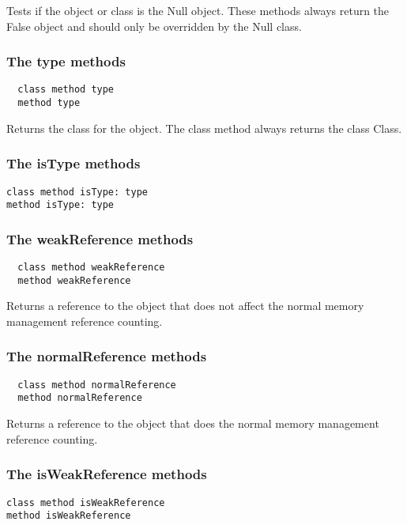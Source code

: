 Tests if the object or class is the Null object. These methods always return the False object and should only be overridden by the Null class.

\hfill
\subsubsection {The type methods}
\begin{lstlisting}
  class method type
  method type
\end{lstlisting}

Returns the class for the object. The class method always returns the class Class.

\hfill
\subsubsection {The isType methods}
\begin{lstlisting}
class method isType: type
method isType: type
\end{lstlisting}

\hfill
\subsubsection {The weakReference methods}
\begin{lstlisting}
  class method weakReference 
  method weakReference
\end{lstlisting}

Returns a reference to the object that does not affect the normal memory management reference counting.

\hfill
\subsubsection {The normalReference methods}
\begin{lstlisting}
  class method normalReference
  method normalReference
\end{lstlisting}

Returns a reference to the object that does the normal memory management reference counting.

\hfill
\subsubsection {The isWeakReference methods}
\begin{lstlisting}
class method isWeakReference
method isWeakReference
\end{lstlisting}

